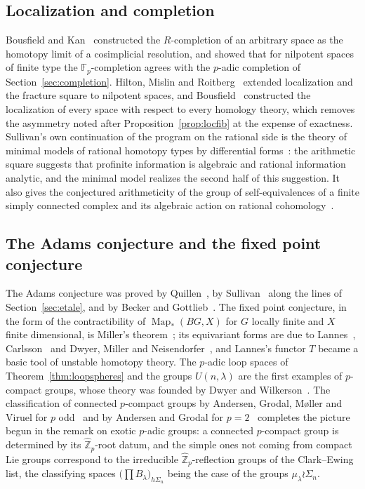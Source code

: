 \documentclass[11pt]{amsart}
\theoremstyle{plain}
\theoremstyle{definition}
\numberwithin{equation}{section}
\newcommand{\F}{\mathbb{F}}
\newcommand{\Zhat}{\widehat{\mathbb{Z}}}
\DeclareMathOperator{\Map}{Map}
\begin{document}
\subsection{Localization and completion}
Bousfield and Kan~\cite{BousfieldKan} constructed the $R$-completion of an arbitrary space as the homotopy limit of a cosimplicial resolution, and showed that for nilpotent spaces of finite type the $\F_p$-completion agrees with the $p$-adic completion of Section~\ref{sec:completion}.
Hilton, Mislin and Roitberg~\cite{HMR} extended localization and the fracture square to nilpotent spaces, and Bousfield~\cite{BousfieldLoc} constructed the localization of every space with respect to every homology theory, which removes the asymmetry noted after Proposition~\ref{prop:locfib} at the expense of exactness.
Sullivan's own continuation of the program on the rational side is the theory of minimal models of rational homotopy types by differential forms~\cite{SulInfinitesimal}: the arithmetic square suggests that profinite information is algebraic and rational information analytic, and the minimal model realizes the second half of this suggestion.
It also gives the conjectured arithmeticity of the group of self-equivalences of a finite simply connected complex and its algebraic action on rational cohomology~\cite{SulInfinitesimal,Wilkerson}.

\subsection{The Adams conjecture and the fixed point conjecture}
The Adams conjecture was proved by Quillen~\cite{QuillenAdams}, by Sullivan~\cite{SulGenetics} along the lines of Section~\ref{sec:etale}, and by Becker and Gottlieb~\cite{BeckerGottlieb}.
The fixed point conjecture, in the form of the contractibility of $\Map_*(BG,X)$ for $G$ locally finite and $X$ finite dimensional, is Miller's theorem~\cite{Miller}; its equivariant forms are due to Lannes~\cite{Lannes}, Carlsson~\cite{Carlsson} and Dwyer, Miller and Neisendorfer~\cite{DMN}, and Lannes's functor $T$ became a basic tool of unstable homotopy theory.
The $p$-adic loop spaces of Theorem~\ref{thm:loopspheres} and the groups $U(n,\lambda)$ are the first examples of $p$-compact groups, whose theory was founded by Dwyer and Wilkerson~\cite{DwyerWilkerson}.
The classification of connected $p$-compact groups by Andersen, Grodal, M{\o}ller and Viruel for $p$ odd~\cite{AGMV} and by Andersen and Grodal for $p=2$~\cite{AndersenGrodal} completes the picture begun in the remark on exotic $p$-adic groups: a connected $p$-compact group is determined by its $\Zhat_p$-root datum, and the simple ones not coming from compact Lie groups correspond to the irreducible $\Zhat_p$-reflection groups of the Clark--Ewing list, the classifying spaces $\bigl(\prod B_\lambda\bigr)_{h\Sigma_n}$ being the case of the groups $\mu_\lambda\wr\Sigma_n$.
\end{document}
